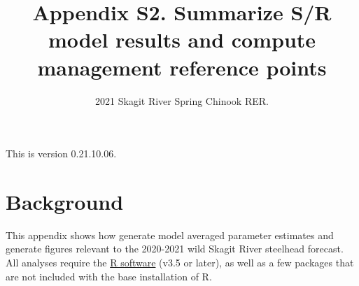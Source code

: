 \documentclass[
  11pt,
]{article}
\title{Appendix S2. Summarize S/R model results and compute management
reference points}
\subtitle{2021 Skagit River Spring Chinook RER.}
\author{}
\date{\vspace{-2.5em}}
\begin{document}
\maketitle

{
\setcounter{tocdepth}{3}
\tableofcontents
}
\vspace{0.2in}

This is version 0.21.10.06.

\hypertarget{background}{%
\section{Background}\label{background}}

This appendix shows how generate model averaged parameter estimates and
generate figures relevant to the 2020-2021 wild Skagit River steelhead
forecast. All analyses require the \href{https://cran.r-project.org/}{R
software} (v3.5 or later), as well as a few packages that are not
included with the base installation of R.
\end{document}
